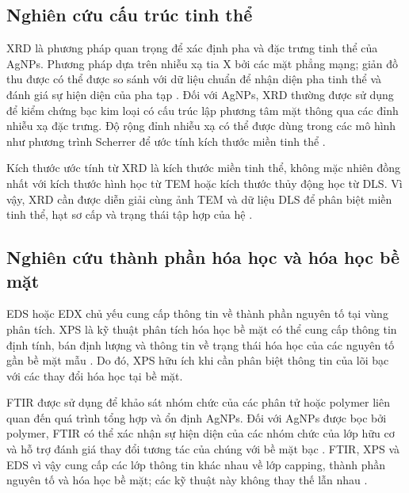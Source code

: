 \subsection{Nghiên cứu cấu trúc tinh thể}
XRD là phương pháp quan trọng để xác định pha và đặc trưng tinh thể của AgNPs.
Phương pháp dựa trên nhiễu xạ tia X bởi các mặt phẳng mạng; giản đồ thu được có thể được so sánh với dữ liệu chuẩn để nhận diện pha tinh thể và đánh giá sự hiện diện của pha tạp \parencite{zhang2016}.
Đối với AgNPs, XRD thường được sử dụng để kiểm chứng bạc kim loại có cấu trúc lập phương tâm mặt thông qua các đỉnh nhiễu xạ đặc trưng.
Độ rộng đỉnh nhiễu xạ có thể được dùng trong các mô hình như phương trình Scherrer để ước tính kích thước miền tinh thể \parencite{zhang2016}.
\par
Kích thước ước tính từ XRD là kích thước miền tinh thể, không mặc nhiên đồng nhất với kích thước hình học từ TEM hoặc kích thước thủy động học từ DLS.
Vì vậy, XRD cần được diễn giải cùng ảnh TEM và dữ liệu DLS để phân biệt miền tinh thể, hạt sơ cấp và trạng thái tập hợp của hệ \parencite{pryshchepa2020}.

\subsection{Nghiên cứu thành phần hóa học và hóa học bề mặt}
EDS hoặc EDX chủ yếu cung cấp thông tin về thành phần nguyên tố tại vùng phân tích.
XPS là kỹ thuật phân tích hóa học bề mặt có thể cung cấp thông tin định tính, bán định lượng và thông tin về trạng thái hóa học của các nguyên tố gần bề mặt mẫu \parencite{zhang2016}.
Do đó, XPS hữu ích khi cần phân biệt thông tin của lõi bạc với các thay đổi hóa học tại bề mặt.
\par
FTIR được sử dụng để khảo sát nhóm chức của các phân tử hoặc polymer liên quan đến quá trình tổng hợp và ổn định AgNPs.
Đối với AgNPs được bọc bởi polymer, FTIR có thể xác nhận sự hiện diện của các nhóm chức của lớp hữu cơ và hỗ trợ đánh giá thay đổi tương tác của chúng với bề mặt bạc \parencite{zhang2016}.
FTIR, XPS và EDS vì vậy cung cấp các lớp thông tin khác nhau về lớp capping, thành phần nguyên tố và hóa học bề mặt; các kỹ thuật này không thay thế lẫn nhau \parencite{patil2021,pryshchepa2020}.


